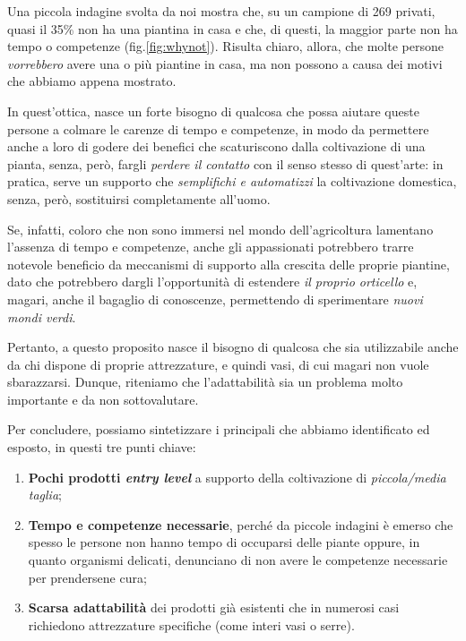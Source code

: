 Una piccola indagine svolta da noi mostra che, su un campione di 269 privati, quasi il 35\% non ha una piantina in casa e che, di questi, la maggior parte non ha tempo o competenze (fig.\ref{fig:whynot}).
Risulta chiaro, allora, che molte persone \textit{vorrebbero} avere una o più piantine in casa, ma non possono a causa dei motivi che abbiamo appena mostrato.

In quest'ottica, nasce un forte bisogno di qualcosa che possa aiutare queste persone a colmare le carenze di tempo e competenze, in modo da permettere anche a loro di godere dei benefici che scaturiscono dalla coltivazione di una pianta, senza, però, fargli \textit{perdere il contatto} con il senso stesso di quest'arte: in pratica, serve un supporto che \textit{semplifichi e automatizzi} la coltivazione domestica, senza, però, sostituirsi completamente all'uomo.

Se, infatti, coloro che non sono immersi nel mondo dell'agricoltura lamentano l'assenza di tempo e competenze, anche gli appassionati potrebbero trarre notevole beneficio da meccanismi di supporto alla crescita delle proprie piantine, dato che potrebbero dargli l'opportunità di estendere \textit{il proprio orticello} e, magari, anche il bagaglio di conoscenze, permettendo di sperimentare \textit{nuovi mondi verdi}.

Pertanto, a questo proposito nasce il bisogno di qualcosa che sia utilizzabile anche da chi dispone di proprie attrezzature, e quindi vasi, di cui magari non vuole sbarazzarsi.
Dunque, riteniamo che l'adattabilità sia un problema molto importante e da non sottovalutare.

Per concludere, possiamo sintetizzare i principali che abbiamo identificato ed esposto, in questi tre punti chiave:
\begin{enumerate}
	\item \textbf{Pochi prodotti \textit{entry level}} a supporto della coltivazione di \textit{piccola/media taglia};
	
	\item \textbf{Tempo e competenze necessarie}, perché da piccole indagini è emerso che spesso le persone non hanno tempo di occuparsi delle piante oppure, in quanto organismi delicati, denunciano di non avere le competenze necessarie per prendersene cura;
	
	\item \textbf{Scarsa adattabilità} dei prodotti già esistenti che in numerosi casi richiedono attrezzature specifiche (come interi vasi o serre).
\end{enumerate}
